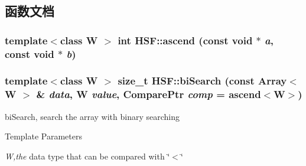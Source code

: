 \subsection{函数文档}
\hypertarget{namespaceHSF_aecb490b70bec1ba6b46c17fcc4ffae89}{
\subsubsection[{ascend}]{\setlength{\rightskip}{0pt plus 5cm}template$<$class W $>$ int HSF::ascend (const void $\ast$ {\em a}, \/  const void $\ast$ {\em b})}}
\label{namespaceHSF_aecb490b70bec1ba6b46c17fcc4ffae89}
\hypertarget{namespaceHSF_a177c9fa2598f6cba867c17cbcfd9c351}{
\subsubsection[{biSearch}]{\setlength{\rightskip}{0pt plus 5cm}template$<$class W $>$ size\_\-t HSF::biSearch (const Array$<$ W $>$ \& {\em data}, \/  W {\em value}, \/  ComparePtr {\em comp} = {\ttfamily ascend$<$W$>$})}}
\label{namespaceHSF_a177c9fa2598f6cba867c17cbcfd9c351}


biSearch, search the array with binary searching 
\begin{DoxyTemplParams}{Template Parameters}
\item[{\em W,the}]data type that can be compared with \char`\"{}$<$\char`\"{} \end{DoxyTemplParams}

